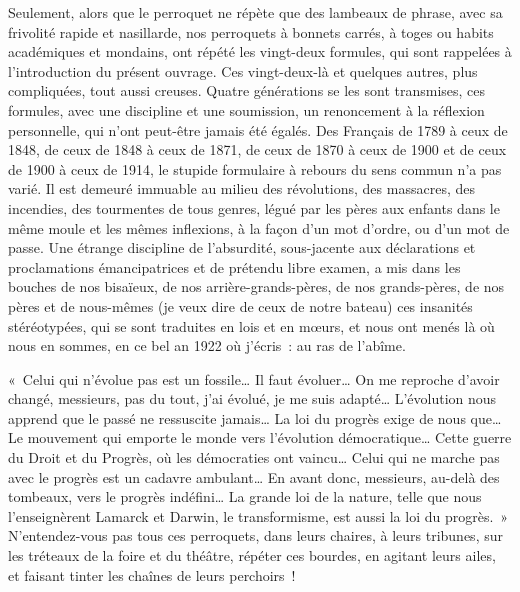 \documentclass[french,twoside]{book} %
\begin{document}
Seulement, alors que le perroquet ne répète que des lambeaux de phrase, avec sa frivolité rapide et nasillarde, nos perroquets à bonnets carrés, à toges ou habits académiques et mondains, ont répété les vingt-deux formules, qui sont rappelées à l’introduction du présent ouvrage. Ces vingt-deux-là et quelques autres, plus compliquées, tout aussi creuses. Quatre générations se les sont transmises, ces formules, avec une discipline et une soumission, un renoncement à la réflexion personnelle, qui n’ont peut-être jamais été égalés. Des Français de 1789 à ceux de 1848, de ceux de 1848 à ceux de 1871, de ceux de 1870 à ceux de 1900 et de ceux de 1900 à ceux de 1914, le stupide formulaire à rebours du sens commun n’a pas varié. Il est demeuré immuable au milieu des révolutions, des massacres, des incendies, des tourmentes de tous genres, légué par les pères aux enfants dans le même moule et les mêmes inflexions, à la façon d’un mot d’ordre, ou d’un mot de passe. Une étrange discipline de l’absurdité, sous-jacente aux déclarations et proclamations émancipatrices et de prétendu libre examen, a mis dans les bouches de nos bisaïeux, de nos arrière-grands-pères, de nos grands-pères, de nos pères et de nous-mêmes (je veux dire de ceux de notre bateau) ces insanités stéréotypées, qui se sont traduites en lois et en mœurs, et nous ont menés là où nous en sommes, en ce bel an 1922 où j’écris : au ras de l’abîme.\par
« Celui qui n’évolue pas est un fossile… Il faut évoluer… On me reproche d’avoir changé, messieurs, pas du tout, j’ai évolué, je me suis adapté… L’évolution nous apprend que le passé ne ressuscite jamais… La loi du progrès exige de nous que… Le mouvement qui emporte le monde vers l’évolution démocratique… Cette guerre du Droit et du Progrès, où les démocraties ont vaincu… Celui qui ne marche pas avec le progrès est un cadavre ambulant… En avant donc, messieurs, au-delà des tombeaux, vers le progrès indéfini… La grande loi de la nature, telle que nous l’enseignèrent Lamarck et Darwin, le transformisme, est aussi la loi du progrès. » N’entendez-vous pas tous ces perroquets, dans leurs chaires, à leurs tribunes, sur les tréteaux de la foire et du théâtre, répéter ces bourdes, en agitant leurs ailes, et faisant tinter les chaînes de leurs perchoirs !\par
\end{document}
